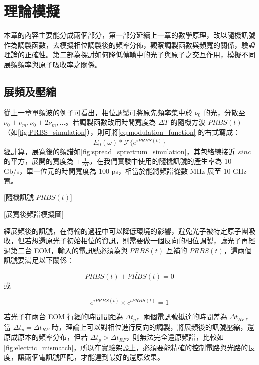 \documentclass[class=NCU_thesis, crop=false]{standalone}
\begin{document}
\chapter{理論模擬}
本章的內容主要能分成兩個部分，第一部分延續上一章的數學原理，改以隨機訊號作為調製函數，去模擬相位調製後的頻率分佈，觀察調製函數與頻寬的關係，驗證理論的正確性。第二部為探討如何降低傳輸中的光子與原子之交互作用，模擬不同展頻頻率與原子吸收率之關係。

\section{展頻及壓縮}
從上一章單頻波的例子可看出，相位調製可將原先頻率集中於 $\nu_{0}$ 的光，分散至 $\nu_{0}\pm\nu_{m}, \nu_{0}\pm2\nu_{m},\dots$。若調製函數改用時間寬度為 $\Delta T$ 的隨機方波 $PRBS(t)$ （如\cref{fig:PRBS_simulation}），則可將\cref{eq:modulation_function} 的右式寫成：
\begin{equation}
    \tilde{E_{0}}(\omega)*\mathscr{F}\{{e^{i PRBS(t)}}\}
\end{equation}
經計算，展寬後的頻譜如\cref{fig:spread_sprectrum_simulation}，其包絡線接近 $sinc$ 的平方，展開的寬度為 $\pm\frac{1}{\Delta T}$，在我們實驗中使用的隨機訊號的產生率為 10 Gb/s，單一位元的時間寬度為 100 ps，相當於能將頻譜從數 MHz 展至 10 GHz 寬。

[隨機訊號 $PRBS(t)$]

[展寬後頻譜模擬圖]

經展頻後的訊號，在傳輸的過程中可以降低環境的影響，避免光子被特定原子團吸收，但若想還原光子初始相位的資訊，則需要做一個反向的相位調製，讓光子再經過第二台 EOM，輸入的電訊號必須為與 $PRBS(t)$ 互補的 $\overline{PRBS}(t)$，這兩個訊號要滿足以下關係：

\begin{equation}
    \label{eq:prbs_condition}
    PRBS(t)+\overline{PRBS}(t)=0
\end{equation}
或

\begin{equation}
    e^{i PRBS(t)}\times e^{i \overline{PRBS}(t)}=1
\end{equation}

若光子在兩台 EOM 行經的時間間距為 $\Delta t_{p}$，兩個電訊號抵達的時間差為 $\Delta t_{RF}$，當 $\Delta t_{p}=\Delta t_{RF}$ 時，理論上可以對相位進行反向的調製，將展頻後的訊號壓縮，還原成原本的頻率分布，但若 $\Delta t_{p}>\Delta t_{RF}$，則無法完全還原頻譜，比較如\cref{fig:electric_mismatch}，所以在實驗架設上，必須要能精確的控制電路與光路的長度，讓兩個電訊號匹配，才能達到最好的還原效果。
\end{document}
